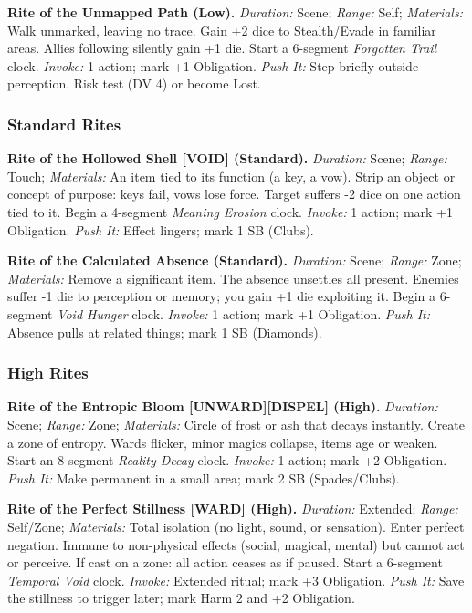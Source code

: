 \textbf{Rite of the Unmapped Path (Low).}  
\emph{Duration:} Scene; \emph{Range:} Self; \emph{Materials:} Walk unmarked, leaving no trace.  
Gain +2 dice to Stealth/Evade in familiar areas. Allies following silently gain +1 die. Start a 6-segment \emph{Forgotten Trail} clock.  
\emph{Invoke:} 1 action; mark +1 Obligation.  
\emph{Push It:} Step briefly outside perception. Risk test (DV 4) or become Lost.

\subsubsection*{Standard Rites}

\textbf{Rite of the Hollowed Shell [VOID] (Standard).}  
\emph{Duration:} Scene; \emph{Range:} Touch; \emph{Materials:} An item tied to its function (a key, a vow).  
Strip an object or concept of purpose: keys fail, vows lose force. Target suffers -2 dice on one action tied to it. Begin a 4-segment \emph{Meaning Erosion} clock.  
\emph{Invoke:} 1 action; mark +1 Obligation.  
\emph{Push It:} Effect lingers; mark 1 SB (Clubs).

\textbf{Rite of the Calculated Absence (Standard).}  
\emph{Duration:} Scene; \emph{Range:} Zone; \emph{Materials:} Remove a significant item.  
The absence unsettles all present. Enemies suffer -1 die to perception or memory; you gain +1 die exploiting it. Begin a 6-segment \emph{Void Hunger} clock.  
\emph{Invoke:} 1 action; mark +1 Obligation.  
\emph{Push It:} Absence pulls at related things; mark 1 SB (Diamonds).

\subsubsection*{High Rites}

\textbf{Rite of the Entropic Bloom [UNWARD][DISPEL] (High).}  
\emph{Duration:} Scene; \emph{Range:} Zone; \emph{Materials:} Circle of frost or ash that decays instantly.  
Create a zone of entropy. Wards flicker, minor magics collapse, items age or weaken. Start an 8-segment \emph{Reality Decay} clock.  
\emph{Invoke:} 1 action; mark +2 Obligation.  
\emph{Push It:} Make permanent in a small area; mark 2 SB (Spades/Clubs).

\textbf{Rite of the Perfect Stillness [WARD] (High).}  
\emph{Duration:} Extended; \emph{Range:} Self/Zone; \emph{Materials:} Total isolation (no light, sound, or sensation).  
Enter perfect negation. Immune to non-physical effects (social, magical, mental) but cannot act or perceive. If cast on a zone: all action ceases as if paused. Start a 6-segment \emph{Temporal Void} clock.  
\emph{Invoke:} Extended ritual; mark +3 Obligation.  
\emph{Push It:} Save the stillness to trigger later; mark Harm 2 and +2 Obligation.


